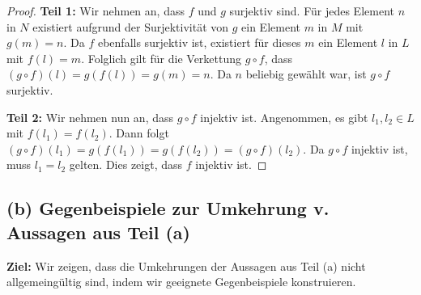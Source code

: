 \documentclass[12pt]{article}
\begin{document}
\begin{proof}
	\textbf{Teil 1:} Wir nehmen an, dass \( f \) und \( g \) surjektiv sind. Für jedes Element \( n \) in \( N \) existiert aufgrund der Surjektivität von \( g \) ein Element \( m \) in \( M \) mit \( g(m) = n \). Da \( f \) ebenfalls surjektiv ist, existiert für dieses \( m \) ein Element \( l \) in \( L \) mit \( f(l) = m \). Folglich gilt für die Verkettung \( g \circ f \), dass \( (g \circ f)(l) = g(f(l)) = g(m) = n \). Da \( n \) beliebig gewählt war, ist \( g \circ f \) surjektiv.

	\textbf{Teil 2:} Wir nehmen nun an, dass \( g \circ f \) injektiv ist. Angenommen, es gibt \( l_1, l_2 \in L \) mit \( f(l_1) = f(l_2) \). Dann folgt \( (g \circ f)(l_1) = g(f(l_1)) = g(f(l_2)) = (g \circ f)(l_2) \). Da \( g \circ f \) injektiv ist, muss \( l_1 = l_2 \) gelten. Dies zeigt, dass \( f \) injektiv ist.
\end{proof}

\subsection*{(b) Gegenbeispiele zur Umkehrung v. Aussagen aus Teil (a)}

\textbf{Ziel:} Wir zeigen, dass die Umkehrungen der Aussagen aus Teil (a) nicht allgemeingültig sind, indem wir geeignete Gegenbeispiele konstruieren.
\end{document}
